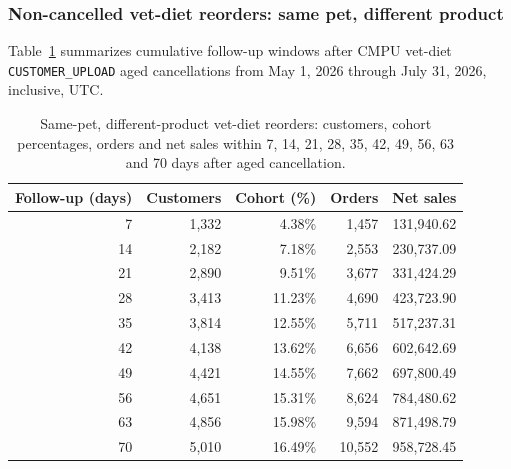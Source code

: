 \clearpage
\subsubsection{Non-cancelled vet-diet reorders: same pet, different product}
Table~\ref{tab:financial-opportunity-reorder-same-pet-different-part} summarizes cumulative
follow-up windows after CMPU vet-diet \texttt{CUSTOMER\_UPLOAD} aged cancellations
from May 1, 2026 through July 31, 2026, inclusive, UTC.

\begin{table}[!htbp]
\centering
\caption{Same-pet, different-product vet-diet reorders: customers, cohort percentages, orders and net sales within 7, 14, 21, 28, 35, 42, 49, 56, 63 and 70 days after aged cancellation.}
\label{tab:financial-opportunity-reorder-same-pet-different-part}
\begin{tabular}{@{}rrrrr@{}}
\toprule
Follow-up (days) & Customers & Cohort (\%) & Orders & Net sales \\
\midrule
7 & 1,332 & 4.38\% & 1,457 & 131,940.62 \\
14 & 2,182 & 7.18\% & 2,553 & 230,737.09 \\
21 & 2,890 & 9.51\% & 3,677 & 331,424.29 \\
28 & 3,413 & 11.23\% & 4,690 & 423,723.90 \\
35 & 3,814 & 12.55\% & 5,711 & 517,237.31 \\
42 & 4,138 & 13.62\% & 6,656 & 602,642.69 \\
49 & 4,421 & 14.55\% & 7,662 & 697,800.49 \\
56 & 4,651 & 15.31\% & 8,624 & 784,480.62 \\
63 & 4,856 & 15.98\% & 9,594 & 871,498.79 \\
70 & 5,010 & 16.49\% & 10,552 & 958,728.45 \\
\bottomrule
\end{tabular}


\end{table}
